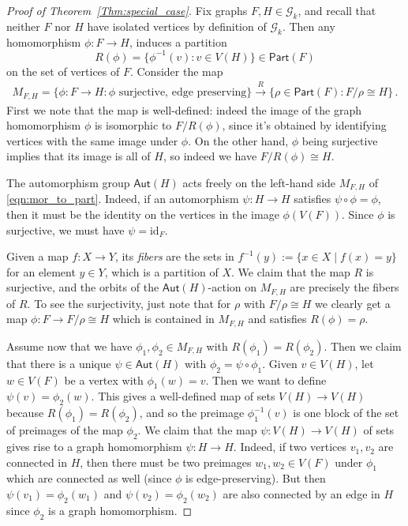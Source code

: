 \documentclass[authorcolumns,numberwithinsect]{no-lipics-v2022}
\begin{document}
\begin{proof}[Proof of Theorem~\ref{Thm:special_case}]
Fix graphs $F,H \in \mathcal{G}_k$, and recall that neither $F$ nor $H$ have isolated vertices by definition of $\mathcal{G}_k$. Then any homomorphism $\phi : F \to H$, induces a partition 
$$R(\phi) = \{\phi^{-1}(v) : v \in V(H)\} \in \mathsf{Part}(F)$$
on the set of vertices of $F$. Consider the map
\begin{align} \label{eqn:mor_to_part}
    M_{F,H}=\{\phi: F \to H : \phi \text{ surjective, edge preserving}\} \xrightarrow{R} \{\rho \in \mathsf{Part}(F) : F/\rho \cong H \}\,.
\end{align}
First we note that the map is well-defined: indeed the image of the graph homomorphism $\phi$ is isomorphic to $F/R(\phi)$, since it's obtained by identifying vertices with the same image under $\phi$. On the other hand, $\phi$ being surjective implies that its image is all of $H$, so indeed we have $F/R(\phi) \cong H$.

The automorphism group $\mathsf{Aut}(H)$ acts freely on the left-hand side $M_{F,H}$ of \eqref{eqn:mor_to_part}. Indeed, if an automorphism $\psi: H \to H$ satisfies $\psi \circ \phi = \phi$, then it must be the identity on the vertices in the image $\phi(V(F))$. Since $\phi$ is surjective, we must have $\psi=\mathrm{id}_F$.


Given a map $f:X\to Y$, its \emph{fibers} are the sets in $f^{-1}(y):=\{x\in X\mid f(x)=y\}$ for an element $y\in Y$, which is a partition of $X$.
We claim that the map $R$ is surjective, and the orbits of the $\mathsf{Aut}(H)$-action on $M_{F,H}$ are precisely the fibers of $R$. To see the surjectivity, just note that for $\rho$ with $F/\rho \cong H$ we clearly get a map $\phi : F \to F/\rho \cong H$ which is contained in $M_{F,H}$ and satisfies $R(\phi)=\rho$.

Assume now that we have $\phi_1, \phi_2 \in M_{F,H}$ with $R(\phi_1) = R(\phi_2)$. Then we claim that there is a unique $\psi \in \mathsf{Aut}(H)$ with $\phi_2 = \psi \circ \phi_1$. Given $v \in V(H)$, let $w \in V(F)$ be a vertex with $\phi_1(w)=v$. Then we want to define $\psi(v)=\phi_2(w)$. This gives a well-defined map of sets $V(H) \to V(H)$ because $R(\phi_1)=R(\phi_2)$, and so the preimage $\phi_1^{-1}(v)$ is one block of the set of preimages of the map $\phi_2$. We claim that the map $\psi: V(H) \to V(H)$ of sets gives rise to a graph homomorphism $\psi: H \to H$. Indeed, if two vertices $v_1, v_2$ are connected in $H$, then there must be two preimages $w_1, w_2 \in V(F)$ under $\phi_1$ which are connected as well (since $\phi$ is edge-preserving). But then $\psi(v_1) = \phi_2(w_1)$ and $\psi(v_2)=\phi_2(w_2)$ are also connected by an edge in $H$ since $\phi_2$ is a graph homomorphism.


\end{proof}
\end{document}
